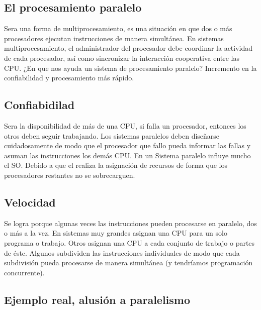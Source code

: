 \begin{center}
\subsection{El procesamiento paralelo}
\end{center}

Sera una forma de multiprocesamiento, es una situación en que dos o más procesadores ejecutan instrucciones de manera simultánea. En sistemas multiprocesamiento, el administrador del procesador debe coordinar la actividad de cada procesador, así como sincronizar la interacción cooperativa entre las CPU.
¿En que nos ayuda un sistema de procesamiento paralelo? Incremento en la confiabilidad y procesamiento más rápido.
\vspace{2.5cm}

\begin{center}
\subsection{Confiabidilad}
\end{center}

Sera la disponibilidad de más de una CPU, si falla un procesador, entonces los otros deben seguir trabajando. Los sistemas paralelos deben diseñarse cuidadosamente de modo que el procesador que fallo pueda informar las fallas y asuman las instrucciones los demás CPU.
En un Sistema paralelo influye mucho el SO. Debido a que el realiza la asignación de recursos de forma que los procesadores restantes no se sobrecarguen.
\vspace{2.5cm}

\begin{center}
\subsection{Velocidad}
\end{center}

Se logra porque algunas veces las instrucciones pueden procesarse en paralelo, dos o más a la vez. En sistemas muy grandes asignan una CPU para un solo programa o trabajo. Otros asignan una CPU a cada conjunto de trabajo o partes de éste. Algunos subdividen las instrucciones individuales de modo que cada subdivisión pueda procesarse de manera simultánea (y tendríamos programación concurrente).\vspace{1.5cm}

\begin{center}
\subsection{Ejemplo real, alusión a paralelismo}
\end{center}

